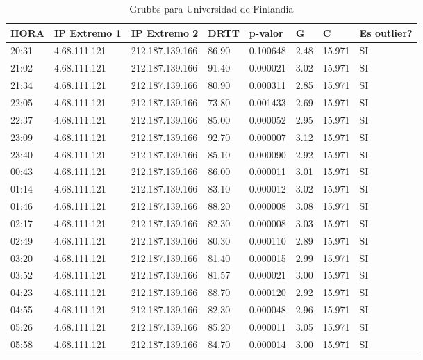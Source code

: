 \begin{table}[H]
	\centering
	\caption{Grubbs para Universidad de Finlandia}
	\label{table:grubbs-inglaterra}
	\begin{tabular}{|l|l|l|l|l|l|l|l|}
		\hline
		HORA & IP Extremo 1 & IP Extremo 2 & DRTT & p-valor & G & C & Es outlier? \\ \hline
		20:31 & 4.68.111.121 & 212.187.139.166 & 86.90 & 0.100648 & 2.48 & 15.971 & SI \\ \hline
		21:02 & 4.68.111.121 & 212.187.139.166 & 91.40 & 0.000021 & 3.02 & 15.971 & SI \\ \hline
		21:34 & 4.68.111.121 & 212.187.139.166 & 80.90 & 0.000311 & 2.85 & 15.971 & SI \\ \hline
		22:05 & 4.68.111.121 & 212.187.139.166 & 73.80 & 0.001433 & 2.69 & 15.971 & SI \\ \hline
		22:37 & 4.68.111.121 & 212.187.139.166 & 85.00 & 0.000052 & 2.95 & 15.971 & SI \\ \hline
		23:09 & 4.68.111.121 & 212.187.139.166 & 92.70 & 0.000007 & 3.12 & 15.971 & SI \\ \hline
		23:40 & 4.68.111.121 & 212.187.139.166 & 85.10 & 0.000090 & 2.92 & 15.971 & SI \\ \hline
		00:43 & 4.68.111.121 & 212.187.139.166 & 86.00 & 0.000011 & 3.01 & 15.971 & SI \\ \hline
		01:14 & 4.68.111.121 & 212.187.139.166 & 83.10 & 0.000012 & 3.02 & 15.971 & SI \\ \hline
		01:46 & 4.68.111.121 & 212.187.139.166 & 88.20 & 0.000008 & 3.08 & 15.971 & SI \\ \hline
		02:17 & 4.68.111.121 & 212.187.139.166 & 82.30 & 0.000008 & 3.03 & 15.971 & SI \\ \hline
		02:49 & 4.68.111.121 & 212.187.139.166 & 80.30 & 0.000110 & 2.89 & 15.971 & SI \\ \hline
		03:20 & 4.68.111.121 & 212.187.139.166 & 81.40 & 0.000015 & 2.99 & 15.971 & SI \\ \hline
		03:52 & 4.68.111.121 & 212.187.139.166 & 81.57 & 0.000021 & 3.00 & 15.971 & SI \\ \hline
		04:23 & 4.68.111.121 & 212.187.139.166 & 88.70 & 0.000120 & 2.92 & 15.971 & SI \\ \hline
		04:55 & 4.68.111.121 & 212.187.139.166 & 82.30 & 0.000048 & 2.96 & 15.971 & SI \\ \hline
		05:26 & 4.68.111.121 & 212.187.139.166 & 85.20 & 0.000011 & 3.05 & 15.971 & SI \\ \hline
		05:58 & 4.68.111.121 & 212.187.139.166 & 84.70 & 0.000014 & 3.00 & 15.971 & SI \\ \hline

\end{tabular}
\end{table}
